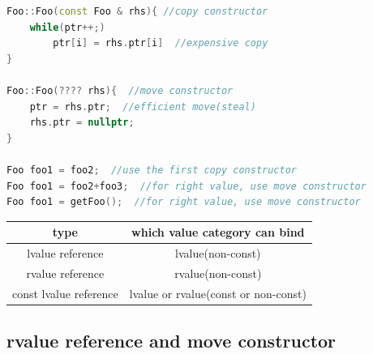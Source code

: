 \documentclass[a4paper,11pt,twoside]{book}
\newcommand{\tophline}{\hline }
\newcommand{\bottomhline}{\\ \hline }
\newcommand{\tophline}{ }
\newcommand{\bottomhline}{ }
\begin{document}
\begin{itemize}
\begin{lstlisting}[frame=single, language=c++]
Foo::Foo(const Foo & rhs){ //copy constructor
	while(ptr++;)
	    ptr[i] = rhs.ptr[i]  //expensive copy
}	

Foo::Foo(???? rhs){  //move constructor
	ptr = rhs.ptr;  //efficient move(steal)
	rhs.ptr = nullptr;
}	
	
Foo foo1 = foo2;  //use the first copy constructor
Foo foo1 = foo2+foo3;  //for right value, use move constructor
Foo foo1 = getFoo();  //for right value, use move constructor
\end{lstlisting}

\begin{center}
		\begin{tabular}{|c|c|}
			\tophline 
			type & which value category can bind \\ 
			\tophline 
			lvalue reference & lvalue(non-const)  \\ 
			\tophline 
			rvalue reference &  rvalue(non-const)\\ 
			\tophline 
			const lvalue reference & lvalue or rvalue(const or non-const)  \bottomhline 
		\end{tabular} 
\end{center}

\end{itemize}

\subsection{ rvalue reference and move constructor}
\end{document}
